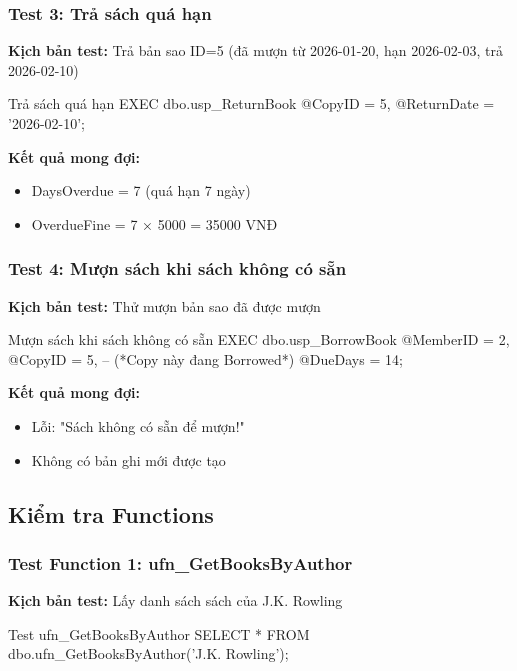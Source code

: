\documentclass[12pt,a4paper]{article}
\begin{document}
\subsubsection{Test 3: Trả sách quá hạn}

\textbf{Kịch bản test:} Trả bản sao ID=5 (đã mượn từ 2026-01-20, hạn 2026-02-03, trả 2026-02-10)

\begin{sqlcode}{Trả sách quá hạn}
EXEC dbo.usp_ReturnBook
    @CopyID = 5,
    @ReturnDate = '2026-02-10';
\end{sqlcode}

\textbf{Kết quả mong đợi:}
\begin{itemize}
    \item DaysOverdue = 7 (quá hạn 7 ngày)
    \item OverdueFine = 7 × 5000 = 35000 VNĐ
\end{itemize}

\subsubsection{Test 4: Mượn sách khi sách không có sẵn}

\textbf{Kịch bản test:} Thử mượn bản sao đã được mượn

\begin{sqlcode}{Mượn sách khi sách không có sẵn}
EXEC dbo.usp_BorrowBook
    @MemberID = 2,
    @CopyID = 5,  -- (*Copy này đang Borrowed*)
    @DueDays = 14;
\end{sqlcode}

\textbf{Kết quả mong đợi:}
\begin{itemize}
    \item Lỗi: "Sách không có sẵn để mượn!"
    \item Không có bản ghi mới được tạo
\end{itemize}

\subsection{Kiểm tra Functions}

\subsubsection{Test Function 1: ufn\_GetBooksByAuthor}

\textbf{Kịch bản test:} Lấy danh sách sách của J.K. Rowling

\begin{sqlcode}{Test ufn\_GetBooksByAuthor}
SELECT * FROM dbo.ufn_GetBooksByAuthor('J.K. Rowling');
\end{sqlcode}
\end{document}
